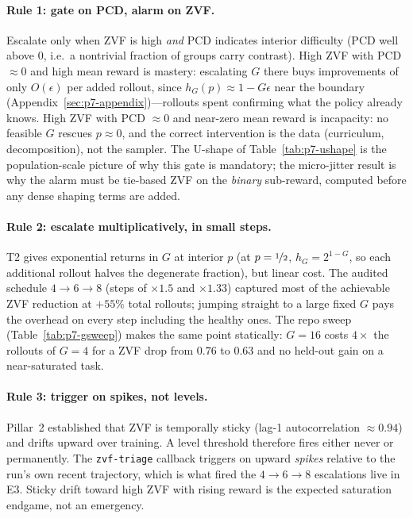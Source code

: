\documentclass{article}
\providecommand{\eps}{\ensuremath{\epsilon}}
\begin{document}
\paragraph{Rule 1: gate on PCD, alarm on ZVF.} Escalate only when ZVF is
high \emph{and} PCD indicates interior difficulty (PCD well above $0$, i.e.\
a nontrivial fraction of groups carry contrast). High ZVF with PCD
$\approx 0$ and high mean reward is mastery: escalating $G$ there buys
improvements of only $O(\eps)$ per added rollout, since
$h_G(p) \approx 1 - G\eps$ near the boundary
(Appendix~\ref{sec:p7-appendix})---rollouts spent confirming what the policy
already knows. High ZVF with PCD $\approx 0$ and near-zero mean reward is
incapacity: no feasible $G$ rescues $p \approx 0$, and the correct
intervention is the data (curriculum, decomposition), not the sampler.
The U-shape of Table~\ref{tab:p7-ushape} is the population-scale picture of
why this gate is mandatory; the micro-jitter result is why the alarm must be
tie-based ZVF on the \emph{binary} sub-reward, computed before any dense
shaping terms are added.

\paragraph{Rule 2: escalate multiplicatively, in small steps.} T2 gives
exponential returns in $G$ at interior $p$ (at $p = \nicefrac12$,
$h_G = 2^{1-G}$, so each additional rollout halves the degenerate
fraction), but linear cost. The audited schedule $4 \to 6 \to 8$ (steps of
$\times 1.5$ and $\times 1.33$) captured most of the achievable ZVF
reduction at $+55\%$ total rollouts; jumping straight to a large fixed $G$
pays the overhead on every step including the healthy ones. The repo sweep
(Table~\ref{tab:p7-gsweep}) makes the same point statically: $G{=}16$ costs
$4\times$ the rollouts of $G{=}4$ for a ZVF drop from $0.76$ to $0.63$ and
no held-out gain on a near-saturated task.

\paragraph{Rule 3: trigger on spikes, not levels.} Pillar~2 established
that ZVF is temporally sticky (lag-1 autocorrelation $\approx 0.94$) and
drifts upward over training. A level threshold therefore fires either never
or permanently. The \texttt{zvf-triage} callback triggers on upward
\emph{spikes} relative to the run's own recent trajectory, which is what
fired the $4 \to 6 \to 8$ escalations live in E3. Sticky drift toward high
ZVF with rising reward is the expected saturation endgame, not an
emergency.
\end{document}

